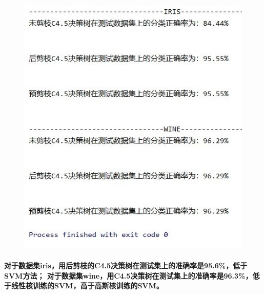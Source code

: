 \documentclass[UTF8]{ctexart}
\begin{document}
\paragraph{}
\begin{figure}[htp]
    \includegraphics{c45.jpg}
\end{figure}
\paragraph{对于数据集iris，用后剪枝的C4.5决策树在测试集上的准确率是95.6\%，低于SVM方法；
对于数据集wine，用C4.5决策树在测试集上的准确率是96.3\%，低于线性核训练的SVM，高于高斯核训练的SVM。}
\end{document}
